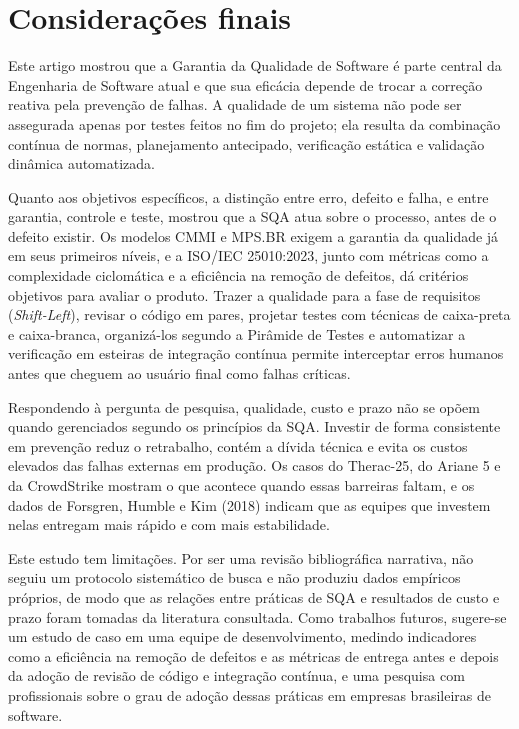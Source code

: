 \documentclass[12pt,a4paper]{article}
\begin{document}
\section{Considerações finais}
\label{sec:conclusao}

Este artigo mostrou que a Garantia da Qualidade de Software é parte central da Engenharia de Software atual e que sua eficácia depende de trocar a correção reativa pela prevenção de falhas. A qualidade de um sistema não pode ser assegurada apenas por testes feitos no fim do projeto; ela resulta da combinação contínua de normas, planejamento antecipado, verificação estática e validação dinâmica automatizada.

Quanto aos objetivos específicos, a distinção entre erro, defeito e falha, e entre garantia, controle e teste, mostrou que a SQA atua sobre o processo, antes de o defeito existir. Os modelos CMMI e MPS.BR exigem a garantia da qualidade já em seus primeiros níveis, e a ISO/IEC 25010:2023, junto com métricas como a complexidade ciclomática e a eficiência na remoção de defeitos, dá critérios objetivos para avaliar o produto. Trazer a qualidade para a fase de requisitos (\textit{Shift-Left}), revisar o código em pares, projetar testes com técnicas de caixa-preta e caixa-branca, organizá-los segundo a Pirâmide de Testes e automatizar a verificação em esteiras de integração contínua permite interceptar erros humanos antes que cheguem ao usuário final como falhas críticas.

Respondendo à pergunta de pesquisa, qualidade, custo e prazo não se opõem quando gerenciados segundo os princípios da SQA. Investir de forma consistente em prevenção reduz o retrabalho, contém a dívida técnica e evita os custos elevados das falhas externas em produção. Os casos do Therac-25, do Ariane 5 e da CrowdStrike mostram o que acontece quando essas barreiras faltam, e os dados de Forsgren, Humble e Kim (2018) indicam que as equipes que investem nelas entregam mais rápido e com mais estabilidade.

Este estudo tem limitações. Por ser uma revisão bibliográfica narrativa, não seguiu um protocolo sistemático de busca e não produziu dados empíricos próprios, de modo que as relações entre práticas de SQA e resultados de custo e prazo foram tomadas da literatura consultada. Como trabalhos futuros, sugere-se um estudo de caso em uma equipe de desenvolvimento, medindo indicadores como a eficiência na remoção de defeitos e as métricas de entrega antes e depois da adoção de revisão de código e integração contínua, e uma pesquisa com profissionais sobre o grau de adoção dessas práticas em empresas brasileiras de software.
\end{document}
